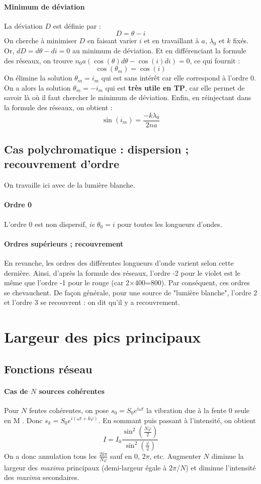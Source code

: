 \documentclass[french]{book}
\theoremstyle{plain}
\theoremstyle{definition}
\theoremstyle{remark}
\begin{document}
\paragraph{Minimum de déviation} La déviation $D$ est définie par : $$D=\theta-i$$ On cherche à minimiser $D$ en faisant varier $i$ et en travaillant à $a$, $\lambda_0$ et $k$ fixés. Or, $dD=d\theta-di=0$ au minimum de déviation. Et en différenciant la formule des réseaux, on trouve $n_0a(\cos(\theta)d\theta-\cos(i)di)=0$, ce qui fournit : $$\cos(\theta_m)=\cos(i)$$ On élimine la solution $\theta_m=i_m$ qui est sans intérêt car elle correspond à l'ordre 0. On a alors la solution $\theta_m=-i_m$ qui est \textbf{très utile en TP}, car elle permet de savoir là où il faut chercher le minimum de déviation. Enfin, en réinjectant dans la formule des réseaux, on obtient : $$\sin(i_m)=\frac{-k\lambda_0}{2na}$$
\subsection{Cas polychromatique : dispersion ; recouvrement d'ordre}
On travaille ici avec de la lumière blanche.
\paragraph{Ordre 0} L'ordre $0$ est non dispersif, \textit{ie} $\theta_0=i$ pour toutes les longueurs d'ondes.
\paragraph{Ordres supérieurs ; recouvrement} En revanche, les ordres des différentes longueurs d'onde varient selon cette dernière. Ainsi, d'après la formule des réseaux, l'ordre -2 pour le violet est le même que l'ordre -1 pour le rouge (car 2$\times$400=800). Par conséquent, ces ordres se chevauchent. De façon générale, pour une source de "lumière blanche", l'ordre 2 et l'ordre 3 se recouvrent : on dit qu'il y a recouvrement.
\section{Largeur des pics principaux}
\subsection{Fonctions réseau}
\paragraph{Cas de $N$ sources cohérentes} Pour $N$ fentes cohérentes, on pose $s_0=S_0e^{i\omega t}$ la vibration due à la fente $0$ seule en M . Donc $s_k = S_0e^{i(\omega t+k\varphi)}$. En sommant puis passant à l’intensité, on obtient $$I = I_0\frac{\sin^2\left(\frac{N\varphi}{2}\right)}{\sin^2\left(\frac{\varphi}{2}\right)}$$ On a donc annulation tous les $\displaystyle\frac{2k\pi}{N\varphi}$ sauf en $0$, $2\pi$, etc. Augmenter $N$ diminue la largeur des \textit{maxima} principaux (demi-largeur égale à $2\pi/N$) et diminue l’intensité des \textit{maxima} secondaires.
\end{document}
